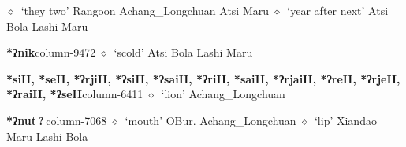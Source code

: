 \hspace{1ex}
         $\diamond$~`they two'
         Rangoon 
\hspace{1ex}
         Achang\_Longchuan 
\hspace{1ex}
         Atsi 
\hspace{1ex}
         Maru 
\hspace{1ex}
         $\diamond$~`year after next'
         Atsi 
\hspace{1ex}
         Bola 
\hspace{1ex}
         Lashi 
\hspace{1ex}
         Maru 
  \item {\footnotesize \textbf{*ʔnik}}{\tiny column-9472}
         $\diamond$~`scold'
         Atsi 
\hspace{1ex}
         Bola 
\hspace{1ex}
         Lashi 
\hspace{1ex}
         Maru 
  \item {\footnotesize \textbf{*siH, *seH, *ʔrjiH, *ʔsiH, *ʔsaiH, *ʔriH, *saiH, *ʔrjaiH, *ʔreH, *ʔrjeH, *ʔraiH, *ʔseH}}{\tiny column-6411}
         $\diamond$~`lion'
         Achang\_Longchuan 
  \item {\footnotesize \textbf{*ʔnut\,?\,}}{\tiny column-7068}
         $\diamond$~`mouth'
         OBur. 
\hspace{1ex}
         Achang\_Longchuan 
\hspace{1ex}
         $\diamond$~`lip'
         Xiandao 
\hspace{1ex}
         Maru 
\hspace{1ex}
         Lashi 
\hspace{1ex}
         Bola 
\hspace{1ex}
